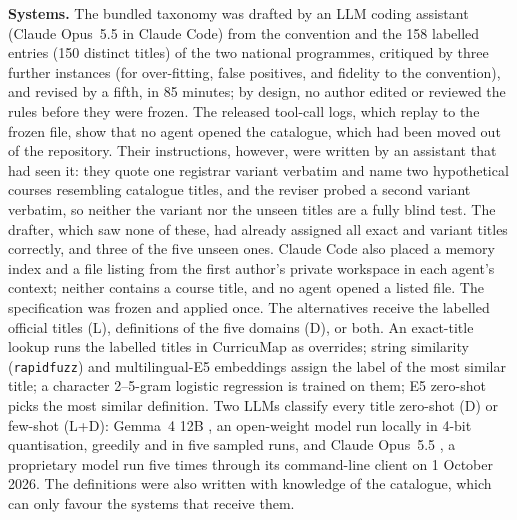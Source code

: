\documentclass[preprint,12pt,a4paper]{elsarticle}
\begin{document}
\textbf{Systems.} The bundled taxonomy was drafted by an LLM coding assistant (Claude Opus~5.5 in Claude Code) from the convention and the 158 labelled entries (150 distinct titles) of the two national programmes, critiqued by three further instances (for over-fitting, false positives, and fidelity to the convention), and revised by a fifth, in 85 minutes; by design, no author edited or reviewed the rules before they were frozen. The released tool-call logs, which replay to the frozen file, show that no agent opened the catalogue, which had been moved out of the repository. Their instructions, however, were written by an assistant that had seen it: they quote one registrar variant verbatim and name two hypothetical courses resembling catalogue titles, and the reviser probed a second variant verbatim, so neither the variant nor the unseen titles are a fully blind test. The drafter, which saw none of these, had already assigned all exact and variant titles correctly, and three of the five unseen ones. Claude Code also placed a memory index and a file listing from the first author's private workspace in each agent's context; neither contains a course title, and no agent opened a listed file. The specification was frozen and applied once. The alternatives receive the labelled official titles (L), definitions of the five domains (D), or both. An exact-title lookup runs the labelled titles in CurricuMap as overrides; string similarity (\texttt{rapidfuzz}) and multilingual-E5 embeddings \cite{wang2024e5,reimers2019} assign the label of the most similar title; a character 2--5-gram logistic regression \cite{pedregosa2011} is trained on them; E5 zero-shot picks the most similar definition. Two LLMs classify every title zero-shot (D) or few-shot (L+D): Gemma~4 12B \cite{gemma4}, an open-weight model run locally in 4-bit quantisation, greedily and in five sampled runs, and Claude Opus~5.5 \cite{claudeopus55}, a proprietary model run five times through its command-line client on 1 October 2026. The definitions were also written with knowledge of the catalogue, which can only favour the systems that receive them.

\begin{table}[t]
\centering\scriptsize
\setlength{\tabcolsep}{3pt}

\caption{Classification of the \nTitles{} registrar titles. Input: labelled official titles (L), domain definitions (D), both, or neither (--). Cov.: titles assigned a domain (CurricuMap flags the rest). Acc.: titles assigned the reference domain (flags count as errors), with a Wilson 95\% interval; with the \nClusters{} title stems as units (numbered courses share one), the bound for 100\% is \clusterLo\%. Correct titles per stratum ($n$): exact official titles, other registrar renderings, titles in neither programme. $p$: exact McNemar test against the first row; a difference of five titles or fewer cannot reach $p<0.05$. String similarity breaks ties by the plain ratio, a rule set after its first run's tie errors were seen. Gemma: greedy decoding; Claude: five runs with identical labels.}
\label{tab:validation}
\end{table}
\end{document}
